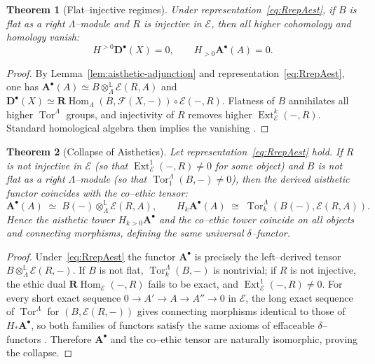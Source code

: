 \documentclass[12pt]{article}
\DeclareMathOperator{\Tor}{Tor}
\newcommand{\E}{\mathcal{E}}
\newcommand{\F}{\mathcal{F}}
\newcommand{\Hom}{\operatorname{Hom}}
\newcommand{\Ext}{\operatorname{Ext}}
\newcommand{\RHom}{\mathbf{R}\!\operatorname{Hom}}
\theoremstyle{plain}
\newtheorem{theorem}{Theorem}[section]
\theoremstyle{definition}
\theoremstyle{remark}
\numberwithin{equation}{section}
\begin{document}
\begin{theorem}[Flat–injective regimes]\label{thm:vanish-A}
Under representation~\eqref{eq:RrepAest}, if $B$ is flat as a right $\Lambda$–module and $R$ is injective in $\E$, then all higher cohomology and homology vanish:
\[
H^{>0}\mathbf D^\bullet(X)=0,\qquad H_{>0}\mathbf A^\bullet(A)=0.
\]
\end{theorem}

\begin{proof}
By Lemma~\ref{lem:aisthetic-adjunction} and representation~\eqref{eq:RrepAest}, one has
$\mathbf A^\bullet(A)\simeq B\otimes^{\mathbb L}_\Lambda\E(R,A)$ and
$\mathbf D^\bullet(X)\simeq \mathbf R\!\Hom_\Lambda(B,\F(X,-))\circ\E(-,R)$.  
Flatness of $B$ annihilates all higher $\Tor^\Lambda$ groups, and injectivity of $R$ removes higher $\Ext_\E^k(-,R)$. Standard homological algebra then implies the vanishing \cite{Weibel1994}.
\end{proof}

\begin{theorem}[Collapse of Aisthetics]\label{thm:collapse-A}
Let representation~\eqref{eq:RrepAest} hold.  
If $R$ is not injective in $\E$ (so that $\Ext^1_\E(-,R)\neq 0$ for some object)
and $B$ is not flat as a right $\Lambda$–module (so that $\Tor_1^\Lambda(B,-)\neq0$),
then the derived aisthetic functor coincides with the co–ethic tensor:
\[
\mathbf A^\bullet(A)\;\simeq\;B(-)\otimes^{\mathbb L}_\Lambda\E(R,A),
\qquad
H_k\mathbf A^\bullet(A)\;\cong\;\Tor_k^\Lambda(B(-),\E(R,A)).
\]
Hence the aisthetic tower $H_{k>0}\mathbf A^\bullet$ and the co–ethic tower
coincide on all objects and connecting morphisms, defining the same universal $\delta$–functor.
\end{theorem}

\begin{proof}
Under~\eqref{eq:RrepAest} the functor $\mathbf A^\bullet$ is precisely the left–derived tensor $B\otimes^{\mathbb L}_\Lambda\E(R,-)$.  
If $B$ is not flat, $\Tor_k^\Lambda(B,-)$ is nontrivial; if $R$ is not injective, the ethic dual $\RHom_\E(-,R)$ fails to be exact, and $\Ext_\E^1(-,R)\neq0$.  
For every short exact sequence $0\to A'\to A\to A''\to0$ in $\E$, the long exact sequence of $\Tor^\Lambda$ for $(B,\E(R,-))$ gives connecting morphisms identical to those of $H_\ast\mathbf A^\bullet$, so both families of functors satisfy the same axioms of effaceable $\delta$–functors \cite{Weibel1994}.  
Therefore $\mathbf A^\bullet$ and the co–ethic tensor are naturally isomorphic, proving the collapse.
\end{proof}
\end{document}
